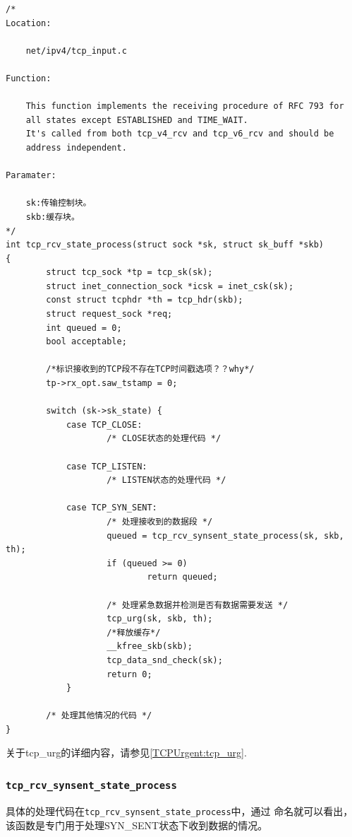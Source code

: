 \begin{verbatim}
/*
Location:

    net/ipv4/tcp_input.c

Function:

    This function implements the receiving procedure of RFC 793 for
    all states except ESTABLISHED and TIME_WAIT.
    It's called from both tcp_v4_rcv and tcp_v6_rcv and should be
    address independent.

Paramater:

    sk:传输控制块。
    skb:缓存块。
*/
int tcp_rcv_state_process(struct sock *sk, struct sk_buff *skb)
{
        struct tcp_sock *tp = tcp_sk(sk);
        struct inet_connection_sock *icsk = inet_csk(sk);
        const struct tcphdr *th = tcp_hdr(skb);
        struct request_sock *req;
        int queued = 0;
        bool acceptable;

        /*标识接收到的TCP段不存在TCP时间戳选项？？why*/
        tp->rx_opt.saw_tstamp = 0;

        switch (sk->sk_state) {
            case TCP_CLOSE:
                    /* CLOSE状态的处理代码 */

            case TCP_LISTEN:
                    /* LISTEN状态的处理代码 */

            case TCP_SYN_SENT:
                    /* 处理接收到的数据段 */
                    queued = tcp_rcv_synsent_state_process(sk, skb, th);
                    if (queued >= 0)
                            return queued;

                    /* 处理紧急数据并检测是否有数据需要发送 */
                    tcp_urg(sk, skb, th);
                    /*释放缓存*/
                    __kfree_skb(skb);
                    tcp_data_snd_check(sk);
                    return 0;
            }

        /* 处理其他情况的代码 */
}
\end{verbatim}

    关于tcp\_urg的详细内容，请参见\ref{TCPUrgent:tcp_urg}.

    \subsubsection{\texttt{tcp_rcv_synsent_state_process}}
        \label{SYN+ACK:tcp_rcv_synsent_state_process}
        具体的处理代码在\texttt{tcp_rcv_synsent_state_process}中，通过
        命名就可以看出，该函数是专门用于处理SYN\_SENT状态下收到数据的情况。

